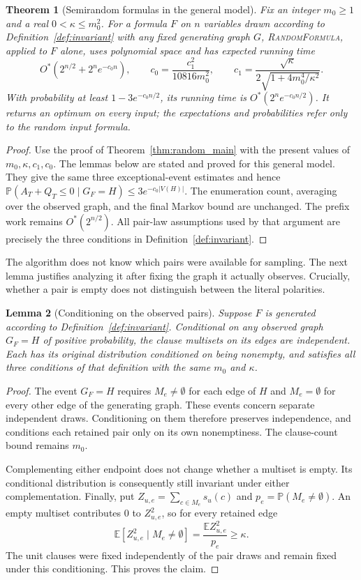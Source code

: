 \documentclass[11pt,a4paper]{article}
\newtheorem{theorem}{Theorem}[section]
\newtheorem{lemma}[theorem]{Lemma}
\theoremstyle{definition}
\theoremstyle{remark}
\newcommand{\Ostar}{O^{*}}
\newcommand{\E}{\mathbb E}
\newcommand{\Prb}{\mathbb P}
\begin{document}
\begin{theorem}[Semirandom formulas in the general model]\label{thm:weighted}
Fix an integer $m_0\ge1$ and a real $0<\kappa\le m_0^2$. For a formula $F$ on $n$ variables drawn
according to Definition~\ref{def:invariant} with any fixed generating
graph $G$, \textnormal{\textsc{RandomFormula}}, applied to $F$ alone, uses
polynomial space and has expected running time
\[
 \Ostar(2^{n/2}+2^n e^{-c_0n}),
 \qquad
 c_0=\frac{c_1^2}{10816m_0^2},\qquad
 c_1=\frac{\sqrt\kappa}{2\sqrt{1+4m_0^4/\kappa^2}}.
\]
With probability at least $1-3e^{-c_0n/2}$, its running time is
$\Ostar(2^ne^{-c_0n/2})$.
It returns an optimum on every input; the expectations and probabilities
refer only to the random input formula.
\end{theorem}


\begin{proof}
Use the proof of Theorem~\ref{thm:random_main} with the present values of
$m_0,\kappa,c_1,c_0$. The lemmas below are stated and proved for this
general model. They give the same three exceptional-event estimates
and hence $\Prb(A_T+Q_T\le0\mid G_F=H)\le3e^{-c_0|V(H)|}$.
The enumeration count, averaging over the observed graph, and the
final Markov bound are unchanged. The prefix work remains
$\Ostar(2^{n/2})$. All pair-law assumptions used by that argument are
precisely the three conditions in Definition~\ref{def:invariant}.
\end{proof}

The algorithm does not know which pairs were available for sampling. The
next lemma justifies analyzing it after fixing the graph it actually
observes. Crucially, whether a pair is empty does not distinguish between
the literal polarities.

\begin{lemma}[Conditioning on the observed pairs]\label{lem:observed_pairs}
Suppose $F$ is generated according to Definition~\ref{def:invariant}.
Conditional on any observed graph $G_F=H$ of positive probability, the
clause multisets on its edges are independent. Each has its original
distribution conditioned on being nonempty, and satisfies all three
conditions of that definition with the same $m_0$ and $\kappa$.
\end{lemma}
\begin{proof}
The event $G_F=H$ requires $M_e\ne\emptyset$ for each edge of $H$ and
$M_e=\emptyset$ for every other edge of the generating graph. These events
concern separate independent draws. Conditioning on them therefore
preserves independence, and conditions each retained pair only on its
own nonemptiness. The clause-count bound remains $m_0$.

Complementing either endpoint does not change whether a multiset is
empty. Its conditional distribution is consequently still invariant
under either complementation. Finally, put
$Z_{u,e}=\sum_{c\in M_e}s_u(c)$ and
$p_e=\Prb(M_e\ne\emptyset)$. An empty multiset contributes $0$ to
$Z_{u,e}^2$, so for every retained edge
\[
 \E[Z_{u,e}^2\mid M_e\ne\emptyset]
 =\frac{\E Z_{u,e}^2}{p_e}\ge\kappa.
\]
The unit clauses were fixed independently of the pair draws and remain
fixed under this conditioning. This proves the claim.
\end{proof}
\end{document}
